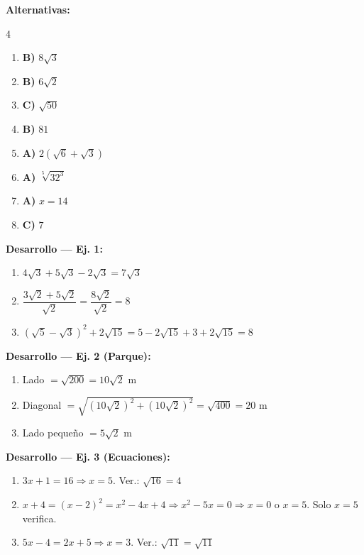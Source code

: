 \documentclass[11pt, letterpaper]{article}
\begin{document}
\begin{tcolorbox}[answerbox, title={Respuestas de algunos ejercicios finales}]
\textbf{Alternativas:}
\begin{multicols}{4}
\begin{enumerate}[label=\textbf{\arabic*.}]
  \item \textbf{B)} $8\sqrt{3}$
  \item \textbf{B)} $6\sqrt{2}$
  \item \textbf{C)} $\sqrt{50}$
  \item \textbf{B)} $81$
  \item \textbf{A)} $2(\sqrt{6}+\sqrt{3})$
  \item \textbf{A)} $\sqrt[5]{32^3}$
  \item \textbf{A)} $x=14$
  \item \textbf{C)} $7$
\end{enumerate}
\end{multicols}

\medskip
\textbf{Desarrollo — Ej. 1:}
\begin{enumerate}[label=\alph*)]
  \item $4\sqrt{3}+5\sqrt{3}-2\sqrt{3}=7\sqrt{3}$
  \item $\dfrac{3\sqrt{2}+5\sqrt{2}}{\sqrt{2}}=\dfrac{8\sqrt{2}}{\sqrt{2}}=8$
  \item $(\sqrt{5}-\sqrt{3})^2+2\sqrt{15}=5-2\sqrt{15}+3+2\sqrt{15}=8$
\end{enumerate}

\medskip
\textbf{Desarrollo — Ej. 2 (Parque):}
\begin{enumerate}[label=\alph*)]
  \item Lado $= \sqrt{200}=10\sqrt{2}$ m
  \item Diagonal $= \sqrt{(10\sqrt{2})^2+(10\sqrt{2})^2}=\sqrt{400}=20$ m
  \item Lado pequeño $= 5\sqrt{2}$ m
\end{enumerate}

\medskip
\textbf{Desarrollo — Ej. 3 (Ecuaciones):}
\begin{enumerate}[label=\alph*)]
  \item $3x+1=16 \Rightarrow x=5$. Ver.: $\sqrt{16}=4$ \checkmark
  \item $x+4=(x-2)^2=x^2-4x+4 \Rightarrow x^2-5x=0 \Rightarrow x=0$ o $x=5$. Solo $x=5$ verifica. \checkmark
  \item $5x-4=2x+5 \Rightarrow x=3$. Ver.: $\sqrt{11}=\sqrt{11}$ \checkmark
\end{enumerate}


\end{tcolorbox}
\end{document}
